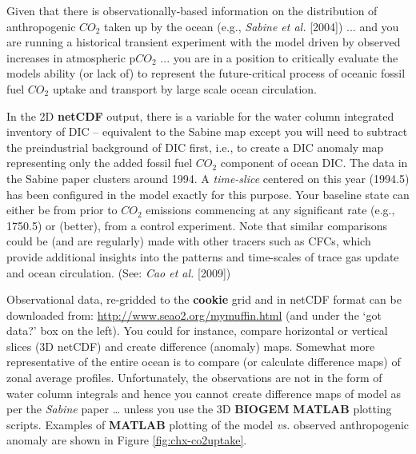 \vspace{1mm}

\noindent Given that there is observationally-based information on the distribution of anthropogenic \(CO_{2}\) taken up by the ocean (e.g., \textit{Sabine et al.} [2004]) ... and you are running a historical transient experiment with the model driven by observed increases in atmospheric p\(CO_{2}\) ... you are in a position to critically evaluate the models ability (or lack of) to represent the future-critical process of oceanic fossil fuel \(CO_{2}\) uptake and transport by large scale ocean circulation.

\vspace{1mm}

In the 2D \textbf{netCDF} output, there is a variable for the water column integrated inventory of DIC – equivalent to the Sabine map except you will need to subtract the preindustrial background of DIC first, i.e., to create a DIC anomaly map representing only the added fossil fuel \(CO_{2}\) component of ocean DIC. The data in the Sabine paper clusters around 1994. A \textit{time-slice} centered on this year (1994.5) has been configured in the model exactly for this purpose. Your baseline state can either be from prior to \(CO_{2}\) emissions commencing at any significant rate (e.g., 1750.5) or (better), from a control experiment. Note that similar comparisons could be (and are regularly) made with other tracers such as CFCs, which provide additional insights into the patterns and time-scales of trace gas update and ocean circulation. (See: \textit{Cao et al.} [2009])

\vspace{1mm}

Observational data, re-gridded to the \textbf{cookie} grid and in netCDF format can be downloaded from: \href{http://www.seao2.org/mymuffin.html}{http://www.seao2.org/mymuffin.html} (and under the ‘got data?’ box on the left). You could for instance, compare horizontal or vertical slices (3D netCDF) and create difference (anomaly) maps. Somewhat more representative of the entire ocean is to compare (or calculate difference maps) of zonal average profiles. Unfortunately, the observations are not in the form of water column integrals and hence you cannot create difference maps of model as per the \textit{Sabine} paper … unless you use the 3D \textbf{BIOGEM} \textbf{MATLAB} plotting scripts. Examples of \textbf{MATLAB} plotting of the model \textit{vs.} observed anthropogenic anomaly are shown in Figure \ref{fig:chx-co2uptake}.

